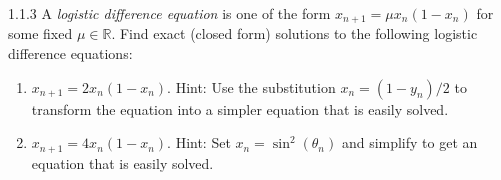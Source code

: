 \begin{problem}{1.1.3}
  A \emph{logistic difference equation} is one of the form $x_{n+1} = \mu x_{n} (1-x_n)$
  for some fixed $\mu \in \mathbb{R}$. Find exact (closed form) solutions to the following
  logistic difference equations:
  \begin{enumerate}
    \item $x_{n+1} = 2 x_{n} (1 - x_n)$. Hint: Use the substitution $x_n = (1 - y_n) / 2$
      to transform the equation into a simpler equation that is easily solved.
    \item $x_{n+1} = 4 x_n (1 - x_n)$. Hint: Set $x_n = \sin^2(\theta_n)$ and simplify
      to get an equation that is easily solved.
  \end{enumerate}
\end{problem}

